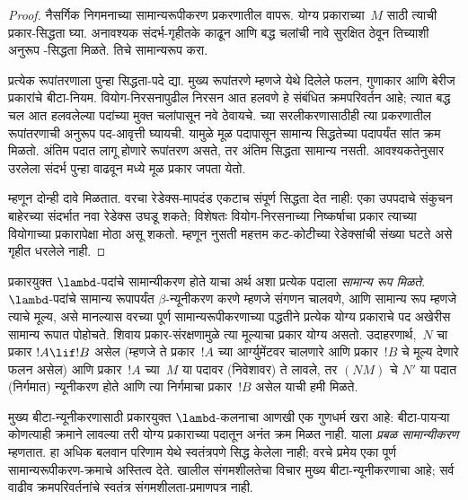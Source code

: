 \documentclass[../../../include/open-logic-section]{subfiles}
\begin{document}
\begin{proof}
  नैसर्गिक निगमनाच्या सामान्यरूपीकरण प्रकरणातील
   वापरू.
  योग्य प्रकाराच्या~$M$ साठी त्याची प्रकार-सिद्धता घ्या.
  अनावश्यक संदर्भ-गृहीतके काढून आणि बद्ध चलांची नावे
  सुरक्षित ठेवून तिच्याशी अनुरूप -सिद्धता
  मिळते. तिचे सामान्यरूप करा.

  प्रत्येक रूपांतरणाला पुन्हा सिद्धता-पदे द्या. मुख्य
  रूपांतरणे म्हणजे येथे दिलेले फलन, गुणाकार आणि बेरीज
  प्रकारांचे बीटा-नियम. वियोग-निरसनापुढील निरसन आत
  हलवणे हे संबंधित क्रमपरिवर्तन आहे; त्यात बद्ध चल
  आत हलवलेल्या पदांच्या मुक्त चलांपासून नवे ठेवायचे.
  \FalseInt{} च्या सरलीकरणासाठीही त्या प्रकरणातील
  रूपांतरणाची अनुरूप पद-आवृत्ती घ्यायची. यामुळे मूळ
  पदापासून सामान्य सिद्धतेच्या पदापर्यंत सांत क्रम मिळतो.
  अंतिम पदात लागू होणारे रूपांतरण असते, तर अंतिम
  सिद्धता सामान्य नसती. आवश्यकतेनुसार उरलेला संदर्भ
  पुन्हा वाढवून  मध्ये मूळ प्रकार जपता येतो.

  म्हणून दोन्ही दावे मिळतात. वरचा रेडेक्स-मापदंड
  एकटाच संपूर्ण सिद्धता देत नाही: एका उपपदाचे संकुचन
  बाहेरच्या संदर्भात नवा रेडेक्स उघडू शकते; विशेषतः
  वियोग-निरसनाच्या निष्कर्षाचा प्रकार त्याच्या वियोगाच्या
  प्रकारापेक्षा मोठा असू शकतो. म्हणून नुसती महत्तम
  कट-कोटीच्या रेडेक्सांची संख्या घटते असे गृहीत धरलेले नाही.
\end{proof}

प्रकारयुक्त $\lambd$-पदांचे सामान्यीकरण होते याचा अर्थ
अशा प्रत्येक पदाला \emph{सामान्य रूप मिळते}. $\lambd$-पदांचे
सामान्य रूपापर्यंत $\beta$-न्यूनीकरण करणे म्हणजे संगणन चालवणे,
आणि सामान्य रूप म्हणजे त्याचे मूल्य, असे मानल्यास वरच्या पूर्ण सामान्यरूपीकरणाच्या पद्धतीने प्रत्येक
योग्य प्रकाराचे पद अखेरीस सामान्य रूपात पोहोचते.
शिवाय प्रकार-संरक्षणामुळे त्या मूल्याचा प्रकार योग्य असतो.
उदाहरणार्थ,~$N$ चा प्रकार $!A \lif !B$ असेल
(म्हणजे ते प्रकार~$!A$ च्या आर्ग्युमेंटवर चालणारे आणि
प्रकार~$!B$ चे मूल्य देणारे फलन असेल) आणि प्रकार~$!A$
च्या~$M$ या पदावर (निवेशावर) ते लावले, तर $(NM)$ चे
$N'$ या पदात (निर्गमात) न्यूनीकरण होते आणि त्या निर्गमाचा
प्रकार~$!B$ असेल याची हमी मिळते.

मुख्य बीटा-न्यूनीकरणासाठी प्रकारयुक्त $\lambd$-कलनाचा
आणखी एक गुणधर्म खरा आहे: बीटा-पायऱ्या कोणत्याही क्रमाने
लावल्या तरी योग्य प्रकाराच्या पदातून अनंत क्रम मिळत नाही.
याला \emph{प्रबळ सामान्यीकरण} म्हणतात. हा अधिक बलवान
परिणाम येथे स्वतंत्रपणे सिद्ध केलेला नाही; वरचे प्रमेय
एका पूर्ण सामान्यरूपीकरण-क्रमाचे अस्तित्व देते.
खालील संगमशीलतेचा विचार मुख्य बीटा-न्यूनीकरणाचा आहे;
सर्व वाढीव क्रमपरिवर्तनांचे स्वतंत्र संगमशीलता-प्रमाणपत्र नाही.
\end{document}
